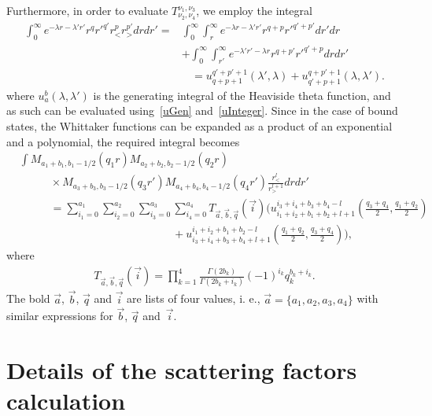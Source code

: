 Furthermore, in order to evaluate $T_{\nu_2,\nu_4}^{\nu_1,\nu_3}$, we
employ the integral
\begin{align}
  \int_0^\infty e^{-\lambda r - \lambda' r'} r^q
    {r'}^{q'} r_{<}^{p} r_{>}^{p'} dr dr' =& \int_0^\infty \int_r^\infty e^{-\lambda r - \lambda' r'} r^{q+p} {r'}^{q'+p'} dr' dr\nonumber
    \\
     &+ \int_0^\infty \int_{r'}^\infty
    e^{-\lambda' r' - \lambda r} r^{q+p'} {r'}^{q'+p} dr dr'
    \nonumber
  \\
  &~~~~=
    u_{q+p+1}^{q'+p'+1}(\lambda',\lambda) +
    u_{q'+p+1}^{q+p'+1}(\lambda,\lambda'). \label{eq:62}
\end{align}
where $u_a^b(\lambda,\lambda')$ is the generating integral of the Heaviside theta function, and as such can be evaluated using~\eqref{uGen} and~\eqref{uInteger}. Since in the case of bound states, the Whittaker functions can be expanded as a product of an exponential and a polynomial, the required integral becomes
  \begin{align}
   & \int
    M_{a_1+b_1,b_1-1/2}(q_1 r) M_{a_2+b_2,b_2-1/2}(q_2 r) \nonumber
    \\
      &\mspace{50mu}\times M_{a_3+b_3,b_3-1/2}(q_3 r')M_{a_4+b_4,b_4-1/2}(q_4 r')
      \frac{r_<^l}{r_>^{l+1}} dr dr' \nonumber
    \\
    &\mspace{50mu}=\sum_{i_1=0}^{a_1} \sum_{i_2=0}^{a_2} \sum_{i_3=0}^{a_3}
      \sum_{i_4=0}^{a_4} T_{\vec{a},\vec{b},\vec{q}}(\vec{i})
      \Big(u_{i_1+i_2+b_1+b_2+l+1}^{i_3+i_4+b_3+b_4-l}
      \left(\frac{q_3+q_4}{2},\frac{q_1+q_2}{2}\right) \nonumber
      \\
      &\mspace{250mu}+ u_{i_3+i_4+b_3+b_4+l+1}^{i_1+i_2+b_1+b_2-l}
      \left(\frac{q_1+q_2}{2},\frac{q_3+q_4}{2}\right)\Big),
  \end{align}
  where
  \begin{align*}
    T_{\vec{a},\vec{b},\vec{q}}(\vec{i}) =
    \prod_{k=1}^4
    \frac{\Gamma(2b_k)}{\Gamma(2b_k+i_k)}
    (-1)^{i_k}q_k^{b_k+i_k}.
  \end{align*}
  The bold $\vec a$,
  $\vec b$, $\vec q$ and $\vec i$ are lists of four values, i. e.,
  $\vec a = \{a_{1}, a_{2}, a_{3}, a_{4}\}$ with similar expressions
  for $\vec b$, $\vec q$ and~$\vec i$.
	
 \section{Details of the scattering factors calculation}
  \label{app:scatter}
  
